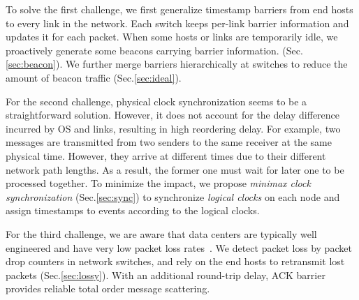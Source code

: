 To solve the first challenge, we first generalize timestamp barriers from end hosts to every link in the network. Each switch keeps per-link barrier information and updates it for each packet. When some hosts or links are temporarily idle, we proactively generate some beacons carrying barrier information. (Sec.\ref{sec:beacon}). We further merge barriers hierarchically at switches to reduce the amount of beacon traffic (Sec.\ref{sec:ideal}). 

For the second challenge, physical clock synchronization seems to be a straightforward solution. However, it does not account for the delay difference incurred by OS and links, resulting in high reordering delay. For example, two messages are transmitted from two senders to the same receiver at the same physical time. However, they arrive at different times due to their different network path lengths. As a result, the former one must wait for later one to be processed together. To minimize the impact, we propose \textit{minimax clock synchronization} (Sec.\ref{sec:sync}) to synchronize \textit{logical clocks} on each node and assign timestamps to events according to the logical clocks.

For the third challenge, we are aware that data centers are typically well engineered and have very low packet loss rates~\cite{ports2015designing}. We detect packet loss by packet drop counters in network switches, and rely on the end hosts to retransmit lost packets (Sec.\ref{sec:lossy}). With an additional round-trip delay, ACK barrier provides reliable total order message scattering.





